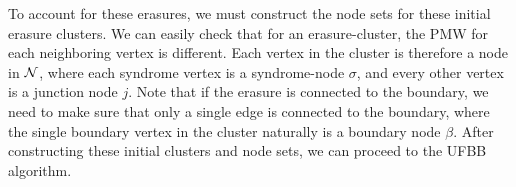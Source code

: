 To account for these erasures, we must construct the node sets for these initial erasure clusters. We can easily check that for an erasure-cluster, the PMW for each neighboring vertex is different. Each vertex in the cluster is therefore a node in $\mathcal{N}$, where each syndrome vertex is a syndrome-node $\sigma$, and every other vertex is a junction node $j$. Note that if the erasure is connected to the boundary, we need to make sure that only a single edge is connected to the boundary, where the single boundary vertex in the cluster naturally is a boundary node $\beta$. After constructing these initial clusters and node sets, we can proceed to the UFBB algorithm.  